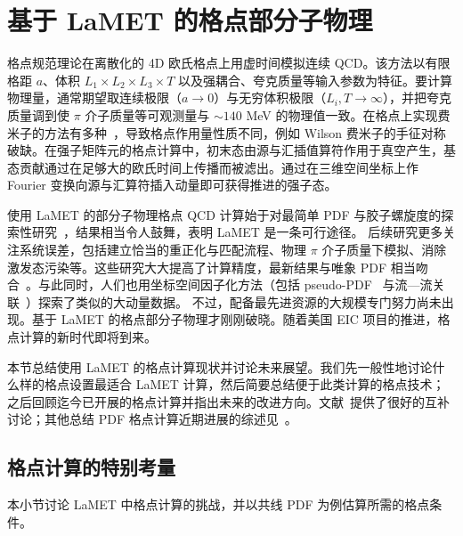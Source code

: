 \section{基于 LaMET 的格点部分子物理}
\label{sec:lattice}

格点规范理论在离散化的 4D 欧氏格点上用虚时间模拟连续 QCD。该方法以有限格距 $a$、体积 $L_1\times L_2\times L_3\times T$ 以及强耦合、夸克质量等输入参数为特征。要计算物理量，通常期望取连续极限（$a\to0$）与无穷体积极限（$L_i, T\to\infty$），并把夸克质量调到使 $\pi$ 介子质量等可观测量与 $\sim 140$ MeV 的物理值一致。在格点上实现费米子的方法有多种~\cite{Rothe:1992nt}，导致格点作用量性质不同，例如 Wilson 费米子的手征对称破缺。在强子矩阵元的格点计算中，初末态由源与汇插值算符作用于真空产生，基态贡献通过在足够大的欧氏时间上传播而被滤出。通过在三维空间坐标上作 Fourier 变换向源与汇算符插入动量即可获得推进的强子态。

使用 LaMET 的部分子物理格点 QCD 计算始于对最简单 PDF 与胶子螺旋度的探索性研究~\cite{Lin:2014zya,Alexandrou:2015rja,Yang:2016plb}，结果相当令人鼓舞，表明 LaMET 是一条可行途径。
%
后续研究更多关注系统误差，包括建立恰当的重正化与匹配流程、物理 $\pi$ 介子质量下模拟、消除激发态污染等。这些研究大大提高了计算精度，最新结果与唯象 PDF 相当吻合~\cite{Alexandrou:2018pbm,Lin:2018qky,Alexandrou:2018eet,Izubuchi:2019lyk,Gao:2020ito}。与此同时，人们也用坐标空间因子化方法（包括 pseudo-PDF~\cite{Orginos:2017kos,Joo:2019bzr,Joo:2019jct,Joo:2020spy} 与流—流关联~\cite{Bali:2019dqc,Sufian:2019bol,Sufian:2020vzb}）探索了类似的大动量数据。
%
不过，配备最先进资源的大规模专门努力尚未出现。基于 LaMET 的格点部分子物理才刚刚破晓。随着美国 EIC 项目的推进，格点计算的新时代即将到来。

本节总结使用 LaMET 的格点计算现状并讨论未来展望。我们先一般性地讨论什么样的格点设置最适合 LaMET 计算，然后简要总结便于此类计算的格点技术；之后回顾迄今已开展的格点计算并指出未来的改进方向。文献~\cite{Cichy:2018mum}提供了很好的互补讨论；其他总结 PDF 格点计算近期进展的综述见~\cite{Monahan:2018euv,Zhao:2020vll,Constantinou:2020pek}。

\subsection{格点计算的特别考量}
\label{sec:lattice-lattice}

本小节讨论 LaMET 中格点计算的挑战，并以共线 PDF 为例估算所需的格点条件。

